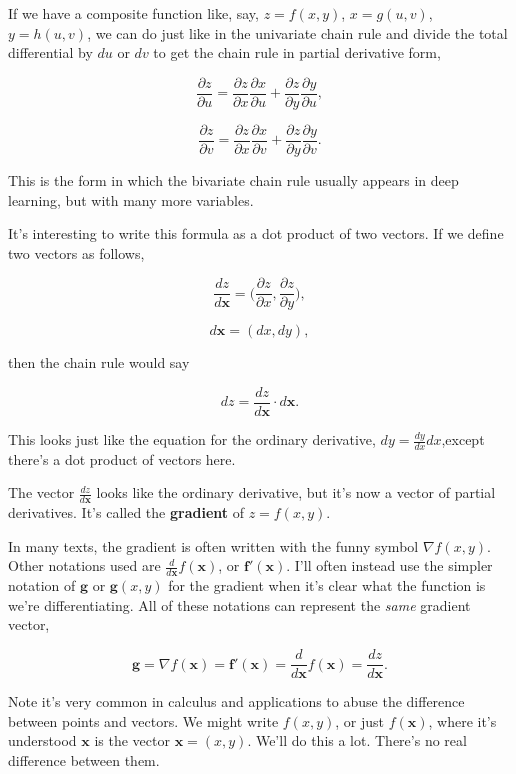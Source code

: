 \documentclass[
  letterpaper,
  DIV=11,
  numbers=noendperiod]{scrreprt}
\begin{document}
If we have a composite function like, say, \(z=f(x,y)\), \(x=g(u, v)\),
\(y=h(u, v)\), we can do just like in the univariate chain rule and
divide the total differential by \(du\) or \(dv\) to get the chain rule
in partial derivative form,

\[\frac{\partial z}{\partial u} = \frac{\partial z}{\partial x}\frac{\partial x}{\partial u} + \frac{\partial z}{\partial y}\frac{\partial y}{\partial u},\]

\[\frac{\partial z}{\partial v} = \frac{\partial z}{\partial x}\frac{\partial x}{\partial v} + \frac{\partial z}{\partial y}\frac{\partial y}{\partial v}.\]

This is the form in which the bivariate chain rule usually appears in
deep learning, but with many more variables.

It's interesting to write this formula as a dot product of two vectors.
If we define two vectors as follows,

\[\frac{dz}{d\mathbf{x}}=\big(\frac{\partial z}{\partial x}, \frac{\partial z}{\partial y}\big),\]

\[d\mathbf{x} = (dx, dy),\]

then the chain rule would say

\[dz = \frac{dz}{d\mathbf{x}} \cdot d\mathbf{x}.\]

This looks just like the equation for the ordinary derivative,
\(dy=\frac{dy}{dx}dx\),except there's a dot product of vectors here.

The vector \(\frac{dz}{d\mathbf{x}}\) looks like the ordinary
derivative, but it's now a vector of partial derivatives. It's called
the \textbf{gradient} of \(z=f(x,y)\).

In many texts, the gradient is often written with the funny symbol
\(\nabla f(x,y)\). Other notations used are
\(\frac{d}{d\mathbf{x}}f(\mathbf{x})\), or \(\mathbf{f}'(\mathbf{x})\).
I'll often instead use the simpler notation of \(\mathbf{g}\) or
\(\mathbf{g}(x,y)\) for the gradient when it's clear what the function
is we're differentiating. All of these notations can represent the
\emph{same} gradient vector,

\[\mathbf{g} = \nabla f(\mathbf{x}) = \mathbf{f}'(\mathbf{x}) = \frac{d}{d\mathbf{x}}f(\mathbf{x}) = \frac{dz}{d\mathbf{x}}.\]

Note it's very common in calculus and applications to abuse the
difference between points and vectors. We might write \(f(x, y)\), or
just \(f(\mathbf{x})\), where it's understood \(\mathbf{x}\) is the
vector \(\mathbf{x}=(x,y)\). We'll do this a lot. There's no real
difference between them.
\end{document}
